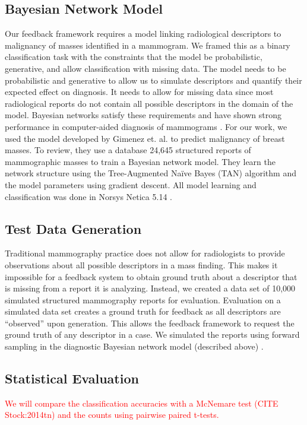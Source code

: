 \subsection{Bayesian Network Model}
Our feedback framework requires a model linking radiological descriptors to malignancy of masses identified in a mammogram. We framed this as a binary classification task with the constraints that the model be probabilistic, generative, and allow classification with missing data. The model needs to be probabilistic and generative to allow us to simulate descriptors and quantify their expected effect on diagnosis. It needs to allow for missing data since most radiological reports do not contain all possible descriptors in the domain of the model. Bayesian networks satisfy these requirements and have shown strong performance in computer-aided diagnosis of mammograms \cite{Burnside:2000wl, ElizabethS:2005gc, Rubin:2005jg, Koller:2009wk, Burnside:2009br}. 
For our work, we used the model developed by Gimenez et. al. \cite{Gimenez:2014tr} to predict malignancy of breast masses. To review, they use a database 24,645 structured reports of mammographic masses to train a Bayesian network model. They learn the network structure using the Tree-Augmented Naïve Bayes (TAN) algorithm and the model parameters using gradient descent. All model learning and classification was done in Norsys Netica 5.14 \cite{Norsys:1998vl}.

\subsection{Test Data Generation}
Traditional mammography practice does not allow for radiologists to provide observations about all possible descriptors in a mass finding. This makes it impossible for a feedback system to obtain ground truth about a descriptor that is missing from a report it is analyzing. Instead, we created a data set of 10,000 simulated structured mammography reports for evaluation. Evaluation on a simulated data set creates a ground truth for feedback as all descriptors are “observed” upon generation. This allows the feedback framework to request the ground truth of any descriptor in a case. We simulated the reports using forward sampling in the diagnostic Bayesian network model (described above) \cite{Koller:2009wk}. 

\subsection{Statistical Evaluation}
\textcolor{red}{We will compare the classification accuracies with a McNemare test (CITE Stock:2014tn) and the counts using pairwise paired t-tests.}

